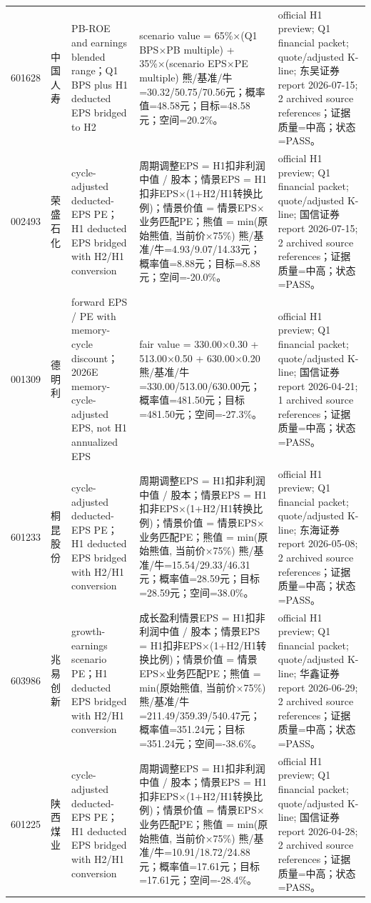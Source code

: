 \begin{longtable}{L{0.85cm}L{1.55cm}L{2.25cm}L{6.0cm}L{4.0cm}}
601628 & 中国人寿 & PB-ROE and earnings blended range；Q1 BPS plus H1 deducted EPS bridged to H2 & scenario value = 65\%×(Q1 BPS×PB multiple) + 35\%×(scenario EPS×PE multiple) 熊/基准/牛=30.32/50.75/70.56元；概率值=48.58元；目标=48.58元；空间=20.2\%。 & official H1 preview; Q1 financial packet; quote/adjusted K-line; 东吴证券 report 2026-07-15; 2 archived source references；证据质量=中高；状态=PASS。 \\
002493 & 荣盛石化 & cycle-adjusted deducted-EPS PE；H1 deducted EPS bridged with H2/H1 conversion & 周期调整EPS = H1扣非利润中值 / 股本；情景EPS = H1扣非EPS×(1+H2/H1转换比例)；情景价值 = 情景EPS×业务匹配PE；熊值 = min(原始熊值, 当前价×75\%) 熊/基准/牛=4.93/9.07/14.33元；概率值=8.88元；目标=8.88元；空间=-20.0\%。 & official H1 preview; Q1 financial packet; quote/adjusted K-line; 国信证券 report 2026-07-15; 2 archived source references；证据质量=中高；状态=PASS。 \\
001309 & 德明利 & forward EPS / PE with memory-cycle discount；2026E memory-cycle-adjusted EPS, not H1 annualized EPS & fair value = 330.00×0.30 + 513.00×0.50 + 630.00×0.20 熊/基准/牛=330.00/513.00/630.00元；概率值=481.50元；目标=481.50元；空间=-27.3\%。 & official H1 preview; Q1 financial packet; quote/adjusted K-line; 国信证券 report 2026-04-21; 1 archived source references；证据质量=中高；状态=PASS。 \\
601233 & 桐昆股份 & cycle-adjusted deducted-EPS PE；H1 deducted EPS bridged with H2/H1 conversion & 周期调整EPS = H1扣非利润中值 / 股本；情景EPS = H1扣非EPS×(1+H2/H1转换比例)；情景价值 = 情景EPS×业务匹配PE；熊值 = min(原始熊值, 当前价×75\%) 熊/基准/牛=15.54/29.33/46.31元；概率值=28.59元；目标=28.59元；空间=38.0\%。 & official H1 preview; Q1 financial packet; quote/adjusted K-line; 东海证券 report 2026-05-08; 2 archived source references；证据质量=中高；状态=PASS。 \\
603986 & 兆易创新 & growth-earnings scenario PE；H1 deducted EPS bridged with H2/H1 conversion & 成长盈利情景EPS = H1扣非利润中值 / 股本；情景EPS = H1扣非EPS×(1+H2/H1转换比例)；情景价值 = 情景EPS×业务匹配PE；熊值 = min(原始熊值, 当前价×75\%) 熊/基准/牛=211.49/359.39/540.47元；概率值=351.24元；目标=351.24元；空间=-38.6\%。 & official H1 preview; Q1 financial packet; quote/adjusted K-line; 华鑫证券 report 2026-06-29; 2 archived source references；证据质量=中高；状态=PASS。 \\
601225 & 陕西煤业 & cycle-adjusted deducted-EPS PE；H1 deducted EPS bridged with H2/H1 conversion & 周期调整EPS = H1扣非利润中值 / 股本；情景EPS = H1扣非EPS×(1+H2/H1转换比例)；情景价值 = 情景EPS×业务匹配PE；熊值 = min(原始熊值, 当前价×75\%) 熊/基准/牛=10.91/18.72/24.88元；概率值=17.61元；目标=17.61元；空间=-28.4\%。 & official H1 preview; Q1 financial packet; quote/adjusted K-line; 国信证券 report 2026-04-28; 2 archived source references；证据质量=中高；状态=PASS。 \\

\end{longtable}
